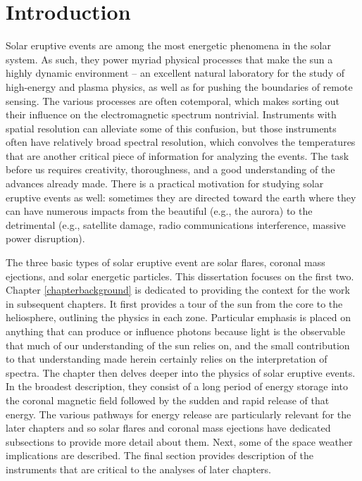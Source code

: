 \chapter{Introduction}
\label{chapterintro}

Solar eruptive events are among the most energetic phenomena in the solar system. As such, they power myriad physical processes that make the sun a highly dynamic environment -- an excellent natural laboratory for the study of high-energy and plasma physics, as well as for pushing the boundaries of remote sensing. The various processes are often cotemporal, which makes sorting out their influence on the electromagnetic spectrum nontrivial. Instruments with spatial resolution can alleviate some of this confusion, but those instruments often have relatively broad spectral resolution, which convolves the temperatures that are another critical piece of information for analyzing the events. The task before us requires creativity, thoroughness, and a good understanding of the advances already made. There is a practical motivation for studying solar eruptive events as well: sometimes they are directed toward the earth where they can have numerous impacts from the beautiful (e.g., the aurora) to the detrimental (e.g., satellite damage, radio communications interference, massive power disruption). 

The three basic types of solar eruptive event are solar flares, coronal mass ejections, and solar energetic particles. This dissertation focuses on the first two. Chapter \ref{chapterbackground} is dedicated to providing the context for the work in subsequent chapters. It first provides a tour of the sun from the core to the heliosphere, outlining the physics in each zone. Particular emphasis is placed on anything that can produce or influence photons because light is the observable that much of our understanding of the sun relies on, and the small contribution to that understanding made herein certainly relies on the interpretation of spectra. The chapter then delves deeper into the physics of solar eruptive events. In the broadest description, they consist of a long period of energy storage into the coronal magnetic field followed by the sudden and rapid release of that energy. The various pathways for energy release are particularly relevant for the later chapters and so solar flares and coronal mass ejections have dedicated subsections to provide more detail about them. Next, some of the space weather implications are described. The final section provides description of the instruments that are critical to the analyses of later chapters. 

